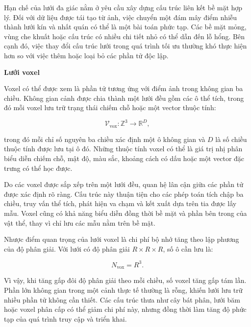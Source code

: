 Hạn chế của lưới đa giác nằm ở yêu cầu xây dựng cấu trúc liên kết bề mặt hợp lý. Đối với dữ liệu được tái tạo từ ảnh, việc chuyển một đám mây điểm nhiễu thành lưới kín và nhất quán có thể là một bài toán phức tạp. Các bề mặt mỏng, vùng che khuất hoặc cấu trúc có nhiều chi tiết nhỏ có thể dẫn đến lỗ hổng. Bên cạnh đó, việc thay đổi cấu trúc lưới trong quá trình tối ưu thường khó thực hiện hơn so với việc thêm hoặc loại bỏ các phần tử độc lập.

\noindent\textbf{Lưới voxel}

Voxel có thể được xem là phần tử tương ứng với điểm ảnh trong không gian ba chiều. Không gian cảnh được chia thành một lưới đều gồm các ô thể tích, trong đó mỗi voxel lưu trữ trạng thái chiếm chỗ hoặc một vector thuộc tính:

\begin{equation}
    \mathcal{V}_{\mathrm{vox}}
    :
    \mathbb{Z}^{3}
    \rightarrow
    \mathbb{R}^{D},
    \label{eq:explicit-voxel-grid}
\end{equation}

trong đó mỗi chỉ số nguyên ba chiều xác định một ô không gian và $D$ là số chiều thuộc tính được lưu tại ô đó. Những thuộc tính voxel có thể là giá trị nhị phân biểu diễn chiếm chỗ, mật độ, màu sắc, khoảng cách có dấu hoặc một vector đặc trưng có thể học được.

Do các voxel được sắp xếp trên một lưới đều, quan hệ lân cận giữa các phần tử được xác định rõ ràng. Cấu trúc này thuận tiện cho các phép toán tích chập ba chiều, truy vấn thể tích, phát hiện va chạm và kết xuất dựa trên tia được lấy mẫu. Voxel cũng có khả năng biểu diễn đồng thời bề mặt và phần bên trong của vật thể, thay vì chỉ lưu các mẫu nằm trên bề mặt.

Nhược điểm quan trọng của lưới voxel là chi phí bộ nhớ tăng theo lập phương của độ phân giải. Với lưới có độ phân giải $R\times R\times R$, số ô cần lưu là:

\begin{equation}
    N_{\mathrm{vox}}
    =
    R^{3}.
    \label{eq:number-of-voxels}
\end{equation}

Vì vậy, khi tăng gấp đôi độ phân giải theo mỗi chiều, số voxel tăng gấp tám lần. Phần lớn không gian trong một cảnh thực tế thường là rỗng, khiến lưới lưu trữ nhiều phần tử không cần thiết. Các cấu trúc thưa như cây bát phân, lưới băm \cite{niessner2013hashing} hoặc voxel phân cấp có thể giảm chi phí này, nhưng đồng thời làm tăng độ phức tạp của quá trình truy cập và triển khai.

